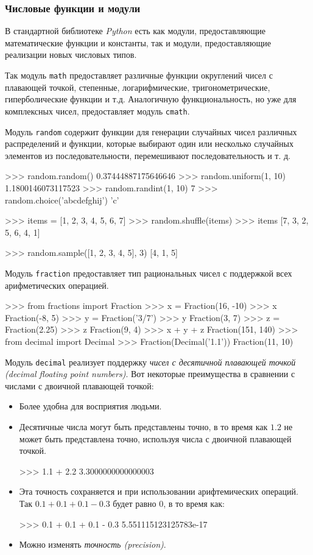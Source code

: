 \subsubsection{Числовые функции и модули}

В стандартной библиотеке \emph{Python} есть как модули, предоставляющие математические функции и константы, так и модули, предоставляющие реализации новых числовых типов.

Так модуль \lstinline{math} предоставляет различные функции округлений чисел с плавающей точкой, степенные, логарифмические, тригонометрические, гиперболические функции и т.д. Аналогичную функциональность, но уже для комплексных чисел, предоставляет модуль \lstinline{cmath}.

Модуль \lstinline{random} содержит функции для генерации случайных чисел различных распределений и функции, которые выбирают один или несколько случайных элементов из последовательности, перемешивают последовательность и т. д.

\begin{pylst}{}{}
>>> random.random()
0.37444887175646646
>>> random.uniform(1, 10)
1.1800146073117523
>>> random.randint(1, 10)
7
>>> random.choice('abcdefghij')
'c'

>>> items = [1, 2, 3, 4, 5, 6, 7]
>>> random.shuffle(items)
>>> items
[7, 3, 2, 5, 6, 4, 1]

>>> random.sample([1, 2, 3, 4, 5],  3)
[4, 1, 5]
\end{pylst}

Модуль \lstinline{fraction} предоставляет тип рациональных чисел с поддержкой всех арифметических операцией.

\begin{pylst}{}{}
>>> from fractions import Fraction
>>> x = Fraction(16, -10)
>>> x
Fraction(-8, 5)
>>> y = Fraction('3/7')
>>> y
Fraction(3, 7)
>>> z = Fraction(2.25)
>>> z
Fraction(9, 4)
>>> x + y + z
Fraction(151, 140)
>>> from decimal import Decimal
>>> Fraction(Decimal('1.1'))
Fraction(11, 10)
\end{pylst}

Модуль \lstinline{decimal} реализует поддержку \emph{чисел с десятичной плавающей точкой (decimal floating point numbers)}. Вот некоторые преимущества в сравнении с числами с двоичной плавающей точкой:
\begin{itemize}
  \item Более удобна для восприятия людьми.
  \item Десятичные числа могут быть представлены точно, в то время как $1.2$ не может быть представлена точно, используя числа с двоичной плавающей точкой.
\begin{pylst}{}{}
>>> 1.1 + 2.2
3.3000000000000003
\end{pylst}
  \item Эта точность сохраняется и при использовании арифтемических операций. Так $0.1 + 0.1 + 0.1 - 0.3$ будет равно $0$, в то время как:
\begin{pylst}{}{}
>>> 0.1 + 0.1 + 0.1 - 0.3
5.551115123125783e-17
\end{pylst}
  \item Можно изменять \emph{точность (precision)}.
\end{itemize}

